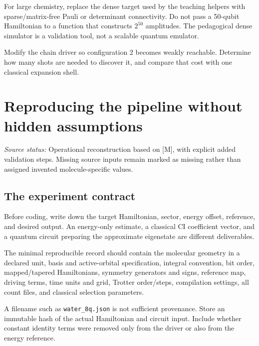 \documentclass[11pt,a4paper,oneside]{report}
\newcommand{\src}[1]{\par{\small\color{grey}\textit{Source status:} #1}\par}
\newcommand{\checkpoint}[1]{\begin{idea}[Check your understanding]#1\end{idea}}
\begin{document}
For large chemistry, replace the dense target used by the teaching helpers with sparse/matrix-free Pauli or determinant connectivity. Do not pass a 50-qubit Hamiltonian to a function that constructs $2^{50}$ amplitudes. The pedagogical dense simulator is a validation tool, not a scalable quantum emulator.

\checkpoint{Modify the chain driver so configuration 2 becomes weakly reachable. Determine how many shots are needed to discover it, and compare that cost with one classical expansion shell.}

\chapter{Reproducing the pipeline without hidden assumptions}\label{ch:repro}
\src{Operational reconstruction based on [M], with explicit added validation steps. Missing source inputs remain marked as missing rather than assigned invented molecule-specific values.}

\section{The experiment contract}
Before coding, write down the target Hamiltonian, sector, energy offset, reference, and desired output. An energy-only estimate, a classical CI coefficient vector, and a quantum circuit preparing the approximate eigenstate are different deliverables.

The minimal reproducible record should contain the molecular geometry in a declared unit, basis and active-orbital specification, integral convention, bit order, mapped/tapered Hamiltonians, symmetry generators and signs, reference map, driving terms, time units and grid, Trotter order/steps, compilation settings, all count files, and classical selection parameters.

A filename such as \texttt{water\_8q.json} is not sufficient provenance. Store an immutable hash of the actual Hamiltonian and circuit input. Include whether constant identity terms were removed only from the driver or also from the energy reference.
\end{document}
